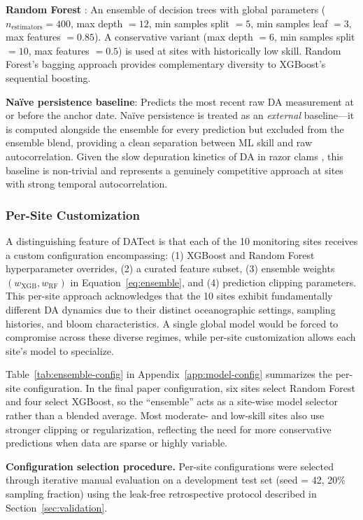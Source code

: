 \documentclass[toxins,article,submit,moreauthors]{Definitions/mdpi}
\begin{document}
\textbf{Random Forest} \cite{Breiman2001}: An ensemble of decision trees with global parameters ($n_{\text{estimators}} = 400$, max depth $= 12$, min samples split $= 5$, min samples leaf $= 3$, max features $= 0.85$). A conservative variant (max depth $= 6$, min samples split $= 10$, max features $= 0.5$) is used at sites with historically low skill. Random Forest's bagging approach provides complementary diversity to XGBoost's sequential boosting.

\textbf{Na\"ive persistence baseline}: Predicts the most recent raw DA measurement at or before the anchor date. Na\"ive persistence is treated as an \textit{external} baseline---it is computed alongside the ensemble for every prediction but excluded from the ensemble blend, providing a clean separation between ML skill and raw autocorrelation. Given the slow depuration kinetics of DA in razor clams \cite{Drum1993}, this baseline is non-trivial and represents a genuinely competitive approach at sites with strong temporal autocorrelation.

\subsubsection{Per-Site Customization}

A distinguishing feature of DATect is that each of the 10 monitoring sites receives a custom configuration encompassing: (1) XGBoost and Random Forest hyperparameter overrides, (2) a curated feature subset, (3) ensemble weights $(w_{\text{XGB}}, w_{\text{RF}})$ in Equation~\eqref{eq:ensemble}, and (4) prediction clipping parameters. This per-site approach acknowledges that the 10 sites exhibit fundamentally different DA dynamics due to their distinct oceanographic settings, sampling histories, and bloom characteristics. A single global model would be forced to compromise across these diverse regimes, while per-site customization allows each site's model to specialize.

Table~\ref{tab:ensemble-config} in Appendix~\ref{app:model-config} summarizes the per-site configuration. In the final paper configuration, six sites select Random Forest and four select XGBoost, so the ``ensemble'' acts as a site-wise model selector rather than a blended average. Most moderate- and low-skill sites also use stronger clipping or regularization, reflecting the need for more conservative predictions when data are sparse or highly variable.

\textbf{Configuration selection procedure.} Per-site configurations were selected through iterative manual evaluation on a development test set (seed = 42, 20\% sampling fraction) using the leak-free retrospective protocol described in Section~\ref{sec:validation}.
\end{document}
